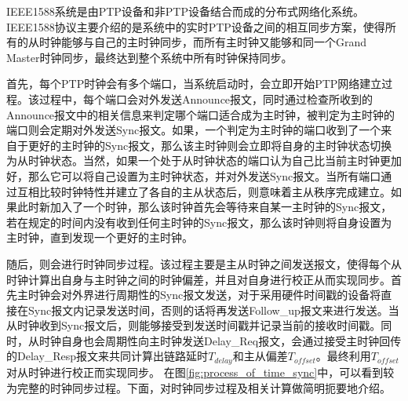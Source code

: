 
IEEE1588系统是由PTP设备和非PTP设备结合而成的分布式网络化系统。IEEE1588协议主要介绍的是系统中的实时PTP设备之间的相互同步方案，使得所有的从时钟能够与自己的主时钟同步，而所有主时钟又能够和同一个Grand Master时钟同步，最终达到整个系统中所有时钟保持同步。

首先，每个PTP时钟会有多个端口，当系统启动时，会立即开始PTP网络建立过程。该过程中，每个端口会对外发送Announce报文，同时通过检查所收到的Announce报文中的相关信息来判定哪个端口适合成为主时钟，被判定为主时钟的端口则会定期对外发送Sync报文。如果，一个判定为主时钟的端口收到了一个来自于更好的主时钟的Sync报文，那么该主时钟则会立即将自身的主时钟状态切换为从时钟状态。当然，如果一个处于从时钟状态的端口认为自己比当前主时钟更加好，那么它可以将自己设置为主时钟状态，并对外发送Sync报文。当所有端口通过互相比较时钟特性并建立了各自的主从状态后，则意味着主从秩序完成建立。如果此时新加入了一个时钟，那么该时钟首先会等待来自某一主时钟的Sync报文，若在规定的时间内没有收到任何主时钟的Sync报文，那么该时钟则将自身设置为主时钟，直到发现一个更好的主时钟。

随后，则会进行时钟同步过程。该过程主要是主从时钟之间发送报文，使得每个从时钟计算出自身与主时钟之间的时钟偏差，并且对自身进行校正从而实现同步。首先主时钟会对外界进行周期性的Sync报文发送，对于采用硬件时间戳的设备将直接在Sync报文内记录发送时间，否则的话将再发送Follow\_up报文来进行发送。当从时钟收到Sync报文后，则能够接受到发送时间戳并记录当前的接收时间戳。同时，从时钟自身也会周期性向主时钟发送Delay\_Req报文，会通过接受主时钟回传的Delay\_Resp报文来共同计算出链路延时$T_{delay}$和主从偏差$T_{offset}$。最终利用$T_{offset}$对从时钟进行校正而实现同步。
\label{sec:1588_theory_sync}
在图\ref{fig:process_of_time_sync}中，可以看到较为完整的时钟同步过程。下面，对时钟同步过程及相关计算做简明扼要地介绍。

